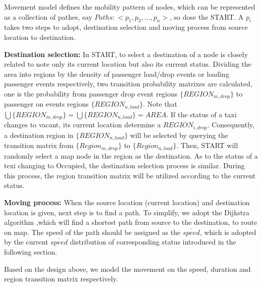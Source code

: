 
Movement model defines the mobility pattern of nodes, which can be represented as a collection of pathes, say $Paths:<p_1,p_2,...,p_n>$, so dose the START. A $p_i$ takes two steps to adopt, destination selection and moving process from source location to destination.

\textbf{Destination selection:} In START, to select a destination of a node is closely related to note only its current location but also its current status. Dividing the area into regions by the density of passenger load/drop events or loading passenger events respectively, two transition probability matrixes are calculated, one is the probability from passenger drop event regions $\{REGION_{m,drop}\}$ to passenger on events regions $\{REGION_{n,load}\}$. Note that $\bigcup\{REGION_{m,drop}\}=\bigcup\{REGION_{n,load}\}=AREA$. If the status of a taxi changes to vacant, its current location determine a $REGION_{i,drop}$. Consequently, a destination region in $\{REGION_{n,load}\}$ will be selected by querying the transition matrix from $\{Region_{m,drop}\}$ to $\{Region_{n,load}\}$. Then, START will randomly select a map node in the region as the destination. As to the status of a texi changing to Occupied, the destination selection process is similar. During this process, the region transition matrix will be utilized according to the current status.

\textbf{Moving process:} When the source location (current location) and destination location is given, next step is to find a path. To simplify, we adopt the Dijkstra algorithm ,which will find a shortest path from source to the destination, to route on map. The speed of the path should be assigned as the $\overline{speed}$, which is adopted by the current $\overline{speed}$  distribution of corresponding status introduced in the following section.

Based on the design above, we model the movement on the speed, duration and region transition matrix respectively.



